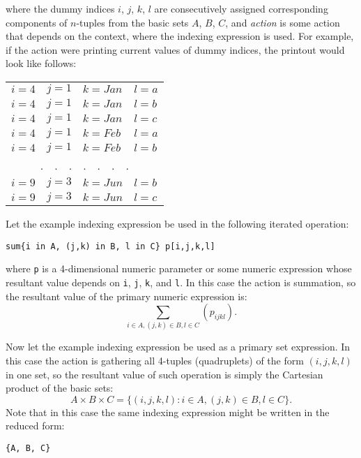 \documentclass[10pt]{article}
\begin{document}
\newpage

\noindent where the dummy indices $i$, $j$, $k$, $l$ are consecutively
assigned corresponding components of $n$-tuples from the basic sets $A$,
$B$, $C$, and {\it action} is some action that depends on the context,
where the indexing expression is used. For example, if the action were
printing current values of dummy indices, the printout would look like
follows:

\medskip

\noindent\hfil
\begin{tabular}{@{}llll@{}}
$i=4$&$j=1$&$k=Jan$&$l=a$\\
$i=4$&$j=1$&$k=Jan$&$l=b$\\
$i=4$&$j=1$&$k=Jan$&$l=c$\\
$i=4$&$j=1$&$k=Feb$&$l=a$\\
$i=4$&$j=1$&$k=Feb$&$l=b$\\
\multicolumn{4}{c}{.\ \ .\ \ .\ \ .\ \ .\ \ .\ \ .}\\
$i=9$&$j=3$&$k=Jun$&$l=b$\\
$i=9$&$j=3$&$k=Jun$&$l=c$\\
\end{tabular}

\medskip

Let the example indexing expression be used in the following iterated
operation:

\medskip

\noindent\hfil
{\tt sum\{i in A, (j,k) in B, l in C\} p[i,j,k,l]}

\medskip

\noindent where {\tt p} is a 4-dimensional numeric parameter or some
numeric expression whose resultant value depends on {\tt i}, {\tt j},
{\tt k}, and {\tt l}. In this case the action is summation, so the
resultant value of the primary numeric expression is:
$$\sum_{i\in A,(j,k)\in B,l\in C}(p_{ijkl}).$$

Now let the example indexing expression be used as a primary set
expression. In this case the action is gathering all 4-tuples
(quadruplets) of the form $(i,j,k,l)$ in one set, so the resultant
value of such operation is simply the Cartesian product of the basic
sets:
$$A\times B\times C=\{(i,j,k,l):i\in A,(j,k)\in B,l\in C\}.$$
Note that in this case the same indexing expression might be written in
the reduced form:

\medskip

\noindent\hfil
{\tt\{A, B, C\}}

\medskip
\end{document}
